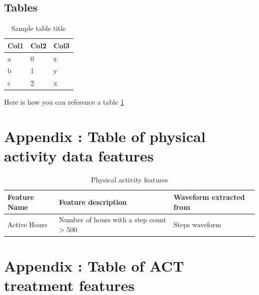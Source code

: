 \documentclass{article}
\begin{document}
\subsection{Tables}
\begin{table}
  \caption{Sample table title}
  \label{sample_table}
  \centering
  \begin{tabular}{lll}
    \toprule
    \cmidrule(r){1-2}
    Col1 & Col2 & Col3 \\
    \midrule
    a & 0 & z\\
    b & 1 & y \\
    c & 2 & x \\
    \bottomrule
  \end{tabular}
\end{table}

Here is how you can reference a table \ref{sample_table}




\appendix
\section{Appendix : Table of physical activity data features}

\begin{table}[h]
  \caption{Physical activity features}
  \label{fitbit_features}
  \centering
  \begin{tabular}{ |l|l|l| }
    \toprule
    \cmidrule(r){1-2}
    \textbf{Feature Name} & \textbf{Feature description} & \textbf{Waveform extracted from} \\
    \midrule
    Active Hours & Number of hours with a step count > 500 & Steps waveform \\
    \bottomrule
    \end{tabular}
\end{table}

\appendix
\section{Appendix : Table of ACT treatment features}
\end{document}
